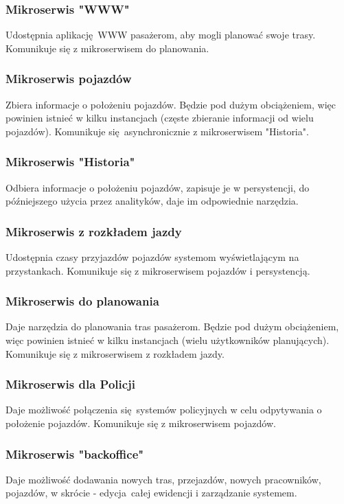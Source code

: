 \documentclass{article}
\begin{document}
      \subsubsection{Mikroserwis "WWW"}
        Udostępnia aplikację WWW pasażerom, aby mogli planować swoje trasy. Komunikuje się z mikroserwisem do planowania.

      \subsubsection{Mikroserwis pojazdów}
        Zbiera informacje o położeniu pojazdów. Będzie pod dużym obciążeniem, więc powinien istnieć w kilku instancjach (częste zbieranie informacji od wielu pojazdów). Komunikuje się asynchronicznie z mikroserwisem "Historia".

      \subsubsection{Mikroserwis "Historia"}
        Odbiera informacje o położeniu pojazdów, zapisuje je w persystencji, do późniejszego użycia przez analityków, daje im odpowiednie narzędzia.

      \subsubsection{Mikroserwis z rozkładem jazdy}
        Udostępnia czasy przyjazdów pojazdów systemom wyświetlającym na przystankach. Komunikuje się z mikroserwisem pojazdów i persystencją.

      \subsubsection{Mikroserwis do planowania}
        Daje narzędzia do planowania tras pasażerom. Będzie pod dużym obciążeniem, więc powinien istnieć w kilku instancjach (wielu użytkowników planujących). Komunikuje się z mikroserwisem z rozkładem jazdy.

      \subsubsection{Mikroserwis dla Policji}
        Daje możliwość połączenia się systemów policyjnych w celu odpytywania o położenie pojazdów. Komunikuje się z mikroserwisem pojazdów.

      \subsubsection{Mikroserwis "backoffice"}
        Daje możliwość dodawania nowych tras, przejazdów, nowych pracowników, pojazdów, w skrócie - edycja całej ewidencji i zarządzanie systemem.
\end{document}
